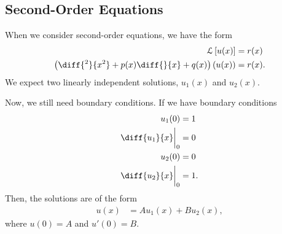 \documentclass[10pt]{mypackage}
\begin{document}
  \subsection{Second-Order Equations}%
  When we consider second-order equations, we have the form
  \begin{align*}
    \mathcal{L}\left[ u(x) \right] &= r(x)\\
    \left( \diff{^2}{x^2} + p(x) \diff{}{x} + q(x) \right)\left( u(x) \right) &= r(x).
  \end{align*}
  We expect two linearly independent solutions, $u_1(x)$ and $u_2(x)$.\newline

  Now, we still need boundary conditions. If we have boundary conditions
  \begin{align*}
    u_1(0) &= 1\\
    \diff{u_1}{x}\biggr\vert_{0} &= 0\\
    u_2(0) &= 0\\
    \diff{u_2}{x}\biggr\vert_{0} &= 1.
  \end{align*}
  Then, the solutions are of the form
  \begin{align*}
    u\left( x \right) &= Au_1(x) + Bu_2(x),
  \end{align*}
  where $u(0) = A$ and $u'(0) = B$.
\end{document}
